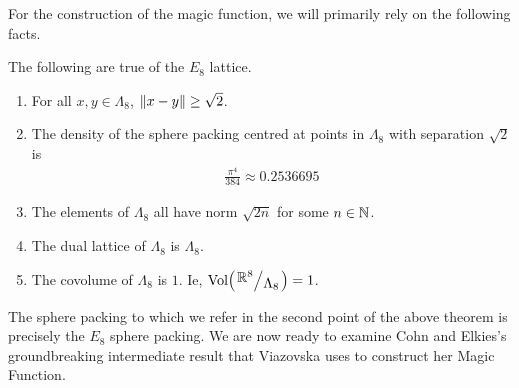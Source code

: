 For the construction of the magic function, we will primarily rely on the following facts.
\begin{boxproposition}\label{Ch2:Prop:E8_Properties}
    The following are true of the $E_8$ lattice.
    \begin{enumerate}
        \item For all $x, y \in \Lambda_8$, $\left\lVert x - y \right\rVert \geq \sqrt{2}$.
        \item The density of the sphere packing centred at points in $\Lambda_8$ with separation $\sqrt{2}$ is
        \begin{align*}
            \frac{\pi^4}{384} \approx 0.2536695
        \end{align*}
        \item The elements of $\Lambda_8$ all have norm $\sqrt{2n}$ for some $n \in \mathbb{N}$.
        \item The dual lattice of $\Lambda_8$ is $\Lambda_8$.
        \item The covolume of $\Lambda_8$ is $1$. Ie, $\Volof{\quotient{\R^8}{\Lambda_8}} = 1$.
    \end{enumerate}
\end{boxproposition}

The sphere packing to which we refer in the second point of the above theorem is precisely the $E_8$ sphere packing. We are now ready to examine Cohn and Elkies's groundbreaking intermediate result that Viazovska uses to construct her Magic Function.
